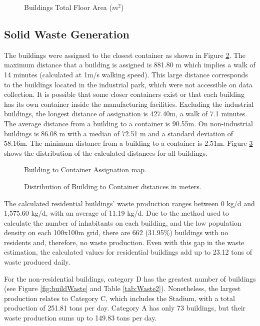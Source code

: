 \documentclass[authoryear,preprint,review,12pt]{elsarticle}
\begin{document}
    \begin{figure}
        \caption{Buildings Total Floor Area ($m^2$)}
        \label{fig:areaMap}
    \end{figure}

    \subsection{Solid Waste Generation} \label{subsec:SolidWasteGen}
    The buildings were assigned to the closest container as shown in Figure \ref{fig:closestCont}. The maximum distance that a building is assigned is 881.80 m which implies a walk of 14 minutes (calculated at 1m/s walking speed). This large distance corresponds to the buildings located in the industrial park, which were not accessible on data collection. It is possible that some closer containers exist or that each building has its own container inside the manufacturing facilities.
    Excluding the industrial buildings, the longest distance of assignation is 427.40m, a walk of 7.1 minutes. The average distance from a building to a container is 90.55m. On non-industrial buildings is 86.08 m with a median of 72.51 m and a standard deviation of 58.16m. The minimum distance from a building to a container is 2.51m. Figure \ref{fig:distances} shows the distribution of the calculated distances for all buildings.

    \begin{figure}
        \caption{Building to Container Assignation map.}
        \label{fig:closestCont}
    \end{figure}

    \begin{figure}
        \caption{Distribution of Building to Container distances in meters.}
        \label{fig:distances}
    \end{figure}

    The calculated residential buildings' waste production ranges between 0 kg/d and 1,575.60 kg/d, with an average of 11.19 kg/d. Due to the method used to calculate the number of inhabitants on each building, and the low population density on each 100x100m grid, there are 662 (31.95\%) buildings with no residents and, therefore, no waste production. Even with this gap in the waste estimation, the calculated values for residential buildings add up to 23.12 tons of waste produced daily.

    For the non-residential buildings, category D has the greatest number of buildings (see Figure \ref{fig:buildWaste} and Table \ref{tab:Waste2}). Nonetheless, the largest production relates to Category C, which includes the Stadium, with a total production of 251.81 tons per day. Category A has only 73 buildings, but their waste production sums up to 149.83 tons per day.
\end{document}
